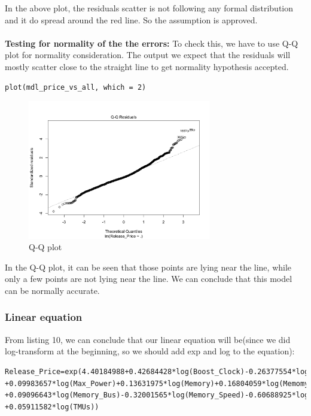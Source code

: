\documentclass[a4paper]{article}
\theoremstyle{definition}
\begin{document}
In the above plot, the residuals scatter is not following any formal distribution and it do spread around the red line. So the assumption is approved.\\
\\
\textbf{Testing for normality of the the errors:} To check this, we have to use Q-Q plot for normality consideration. The output we expect that the residuals will mostly scatter close to the straight line to get normality hypothesis accepted.
\begin{mdframed}[leftline=false,rightline=false,backgroundcolor=lightblue!10,nobreak=false]
    \begin{verbatim}
plot(mdl_price_vs_all, which = 2)
\end{verbatim}
\end{mdframed}
\begin{figure}[h!]
\begin{center}
\includegraphics[width=8cm]{images/qq.png}
\end{center}
\caption{Q-Q plot}
\end{figure}
In the Q-Q plot, it can be seen that those points are lying near the line, while only a few points are not lying near the line. We can conclude that this model can be normally accurate.
\subsubsection{Linear equation}

From listing 10, we can conclude that our linear equation will be(since we did log-transform at the beginning, so we should add exp and log to the equation):
\begin{mdframed}[leftline=false,rightline=false,backgroundcolor=lightblue!10,nobreak=false,numbers=false]
    \begin{verbatim}
Release_Price=exp(4.40184988+0.42684428*log(Boost_Clock)-0.26377554*log(Core_Speed)
+0.09983657*log(Max_Power)+0.13631975*log(Memory)+0.16804059*log(Memomy_Bandwidth)
+0.09096643*log(Memory_Bus)-0.32001565*log(Memory_Speed)-0.60688925*log(Shader)
+0.05911582*log(TMUs))
\end{verbatim}
\end{mdframed}
\end{document}
